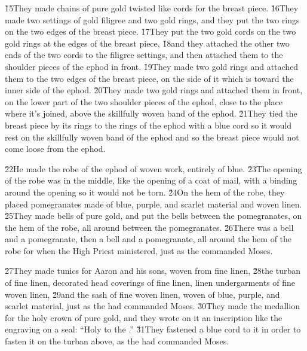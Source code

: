 \v{15}They made chains of pure gold twisted like cords for the breast piece. \v{16}They made two settings of gold filigree and two gold rings, and they put the two rings on the two edges of the breast piece. \v{17}They put the two gold cords on the two gold rings at the edges of the breast piece, \v{18}and they attached the other two ends of the two cords to the filigree settings, and then attached them to the shoulder pieces of the ephod in front. \v{19}They made two gold rings and attached them to the two edges of the breast piece, on the side of it which is toward the inner side of the ephod. \v{20}They made two gold rings and attached them in front, on the lower part of the two shoulder pieces of the ephod, close to the place where it's joined, above the skillfully woven band of the ephod. \v{21}They tied the breast piece by its rings to the rings of the ephod with a blue cord so it would rest on the skillfully woven band of the ephod and so the breast piece would not come loose from the ephod.

\v{22}He made the robe of the ephod of woven work, entirely of blue. \v{23}The opening of the robe was in the middle, like the opening of a coat of mail, with a binding around the opening so it would not be torn. \v{24}On the hem of the robe, they placed pomegranates made of blue, purple, and scarlet material and woven linen. \v{25}They made bells of pure gold, and put the bells between the pomegranates, on the hem of the robe, all around between the pomegranates. \v{26}There was a bell and a pomegranate, then a bell and a pomegranate, all around the hem of the robe for when the High Priest ministered, just as the  commanded Moses.

\v{27}They made tunics for Aaron and his sons, woven from fine linen, \v{28}the turban of fine linen, decorated head coverings of fine linen, linen undergarments of fine woven linen, \v{29}and the sash of fine woven linen, woven of blue, purple, and scarlet material, just as the  had commanded Moses. \v{30}They made the medallion for the holy crown of pure gold, and they wrote on it an inscription like the engraving on a seal: ``Holy to the .'' \v{31}They fastened a blue cord to it in order to fasten it on the turban above, as the  had commanded Moses.

